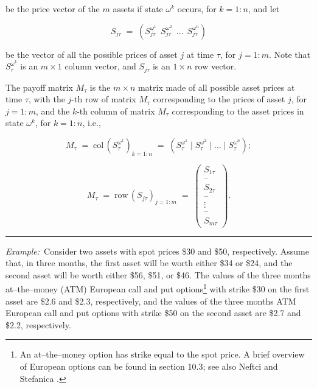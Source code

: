 be the price vector of the $m$ assets if state $\omega^k$ occurs, for
$k=1:n$, and let

\[
S_{j\tau} \;=\; \left(S_{j\tau}^{\omega^1}\ \ S_{j\tau}^{\omega^2}\ \ \ldots\
\ S_{j\tau}^{\omega^n}\right)
\]

be the vector of all the possible prices of asset $j$ at time $\tau$, for
$j=1:m$. Note that $S_\tau^{\omega^k}$ is an $m\times 1$ column vector, and
$S_{j\tau}$ is an $1\times n$ row vector.

The payoff matrix $M_\tau$ is the $m\times n$ matrix made of all possible
asset prices at time $\tau$, with the $j$-th row of matrix $M_\tau$
corresponding to the prices of asset $j$, for $j=1:m$, and the $k$-th
column of matrix $M_\tau$ corresponding to the asset prices in state
$\omega^k$, for $k=1:n$, i.e.,

\begin{equation}
M_\tau \;=\; \mathrm{col}\,\left(S_\tau^{\omega^k}\right)_{k=1:n} \;=\;
\left(S_\tau^{\omega^1} \mid S_\tau^{\omega^2} \mid \ldots \mid
S_\tau^{\omega^n}\right);
\end{equation}

\begin{equation}
M_\tau \;=\; \mathrm{row}\,(S_{j\tau})_{j=1:m} \;=\;
\begin{pmatrix} S_{1\tau} \\ \text{--} \\ S_{2\tau} \\ \text{--} \\ \vdots \\
\text{--} \\ S_{m\tau} \end{pmatrix}.
\end{equation}

\medskip
\noindent\rule{\linewidth}{0.4pt}
\medskip

\noindent\textit{Example:}\ Consider two assets with spot prices \$30 and
\$50, respectively. Assume that, in three months, the first asset will be
worth either \$34 or \$24, and the second asset will be worth either \$56,
\$51, or \$46. The values of the three months at--the--money (ATM) European
call and put options\footnote{An at--the--money option has strike equal to
the spot price. A brief overview of European options can be found in
section 10.3; see also Neftci \cite{31} and Stefanica \cite{36}.}
with strike \$30 on the first asset are \$2.6 and \$2.3, respectively, and
the values of the three months ATM European call and put options with
strike \$50 on the second asset are \$2.7 and \$2.2, respectively.

